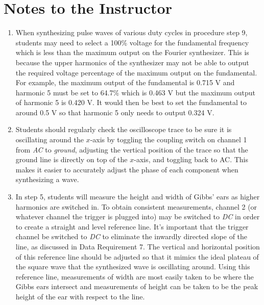 \section{Notes to the Instructor}
\begin{enumerate}

\item When synthesizing pulse waves of various duty cycles in procedure step 9, students may need to select a 100\% voltage for the fundamental frequency which is less than the maximum output on the Fourier synthesizer. This is because the upper harmonics of the synthesizer may not be able to output the required voltage percentage of the maximum output on the fundamental. For example, the maximum output of the fundamental is 0.715 V and harmonic 5 must be set to 64.7\% which is 0.463 V but the maximum output of harmonic 5 is 0.420 V. It would then be best to set the fundamental to around 0.5 V so that harmonic 5 only needs to output 0.324 V.
\item Students should regularly check the oscilloscope trace to be sure it is oscillating around the $x$-axis by toggling the coupling switch on channel 1 from {\it AC} to {\it ground}, adjusting the vertical position of the trace so that the ground line is directly on top of the $x$-axis, and toggling back to AC. This makes it easier to accurately adjust the phase of each component when synthesizing a wave.
\item In step 5, students will measure the height and width of Gibbs' ears as higher harmonics are switched in. To obtain consistent measurements, channel 2 (or whatever channel the trigger is plugged into) may be switched to {\it DC} in order to create a straight and level reference line. It's important that the trigger channel be switched to {\it DC} to eliminate the inwardly directed slope of the line, as discussed in Data Requirement 7. The vertical and horizontal position of this reference line should be adjusted so that it mimics the ideal plateau of the square wave that the synthesized wave is oscillating around. Using this reference line, measurements of width are most easily taken to be where the Gibbs ears intersect and measurements of height can be taken to be the peak height of the ear with respect to the line. 

\end{enumerate}


